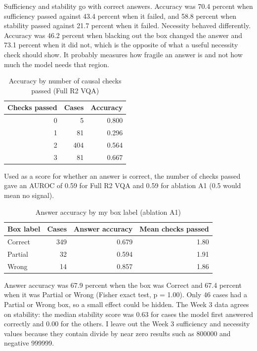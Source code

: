 \documentclass[11pt]{article}
\begin{document}
Sufficiency and stability go with correct answers. Accuracy was 70.4 percent when sufficiency passed against 43.4 percent when it failed, and 58.8 percent when stability passed against 21.7 percent when it failed. Necessity behaved differently. Accuracy was 46.2 percent when blacking out the box changed the answer and 73.1 percent when it did not, which is the opposite of what a useful necessity check should show. It probably measures how fragile an answer is and not how much the model needs that region.

\begin{table}[h]
\centering
\caption{Accuracy by number of causal checks passed (Full R2 VQA)}
\begin{tabular}{rrr}
\toprule
Checks passed & Cases & Accuracy \\
\midrule
0 & 5 & 0.800 \\
1 & 81 & 0.296 \\
2 & 404 & 0.564 \\
3 & 81 & 0.667 \\
\bottomrule
\end{tabular}
\end{table}

Used as a score for whether an answer is correct, the number of checks passed gave an AUROC of 0.59 for Full R2 VQA and 0.59 for ablation A1 (0.5 would mean no signal).

\begin{table}[h]
\centering
\caption{Answer accuracy by my box label (ablation A1)}
\begin{tabular}{lrrr}
\toprule
Box label & Cases & Answer accuracy & Mean checks passed \\
\midrule
Correct & 349 & 0.679 & 1.80 \\
Partial & 32 & 0.594 & 1.91 \\
Wrong & 14 & 0.857 & 1.86 \\
\bottomrule
\end{tabular}
\end{table}

Answer accuracy was 67.9 percent when the box was Correct and 67.4 percent when it was Partial or Wrong (Fisher exact test, p = 1.00). Only 46 cases had a Partial or Wrong box, so a small effect could be hidden. The Week 3 data agrees on stability: the median stability score was 0.63 for cases the model first answered correctly and 0.00 for the others. I leave out the Week 3 sufficiency and necessity values because they contain divide by near zero results such as 800000 and negative 999999.
\end{document}
